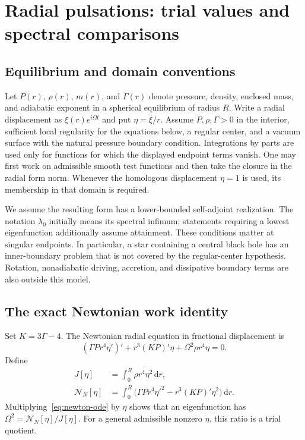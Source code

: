 \documentclass[11pt,letterpaper]{article}
\newcommand{\dd}{\,\mathrm d}
\theoremstyle{definition}
\numberwithin{equation}{section}
\begin{document}
\section{Radial pulsations: trial values and spectral comparisons}
\label{sec:radial}

\subsection{Equilibrium and domain conventions}

Let $P(r)$, $\rho(r)$, $m(r)$, and $\Gamma(r)$ denote pressure, density,
enclosed mass, and adiabatic exponent in a spherical equilibrium of radius
$R$. Write a radial displacement as $\xi(r)e^{i\Omega t}$ and put
$\eta=\xi/r$. Assume $P,\rho,\Gamma>0$ in the interior, sufficient local
regularity for the equations below, a regular center, and a vacuum surface
with the natural pressure boundary condition. Integrations by parts are
used only for functions for which the displayed endpoint terms vanish.
One may first work on admissible smooth test functions and then take the
closure in the radial form norm. Whenever the homologous displacement
$\eta=1$ is used, its membership in that domain is required.

We assume the resulting form has a lower-bounded self-adjoint realization.
The notation $\lambda_0$ initially means its spectral infimum; statements
requiring a lowest eigenfunction additionally assume attainment. These
conditions matter at singular endpoints. In particular, a star containing
a central black hole has an inner-boundary problem that is not covered by
the regular-center hypothesis. Rotation, nonadiabatic driving, accretion,
and dissipative boundary terms are also outside this model.

\subsection{The exact Newtonian work identity}

Set $K=3\Gamma-4$. The Newtonian radial equation in fractional displacement
is
\begin{equation}
 (\Gamma P r^4\eta')'+r^3(KP)'\eta
       +\Omega^2\rho r^4\eta=0.
 \label{eq:newton-ode}
\end{equation}
Define
\begin{align}
 J[\eta]&=\int_0^R\rho r^4\eta^2\dd r,\label{eq:inertia}\\
 \mathcal N_N[\eta]&=\int_0^R
       \bigl(\Gamma P r^4\eta'^2-r^3(KP)'\eta^2\bigr)\dd r.
 \label{eq:newton-work}
\end{align}
Multiplying~\eqref{eq:newton-ode} by $\eta$ shows that an eigenfunction has
$\Omega^2=\mathcal N_N[\eta]/J[\eta]$. For a general admissible nonzero
$\eta$, this ratio is a trial quotient.
\end{document}
